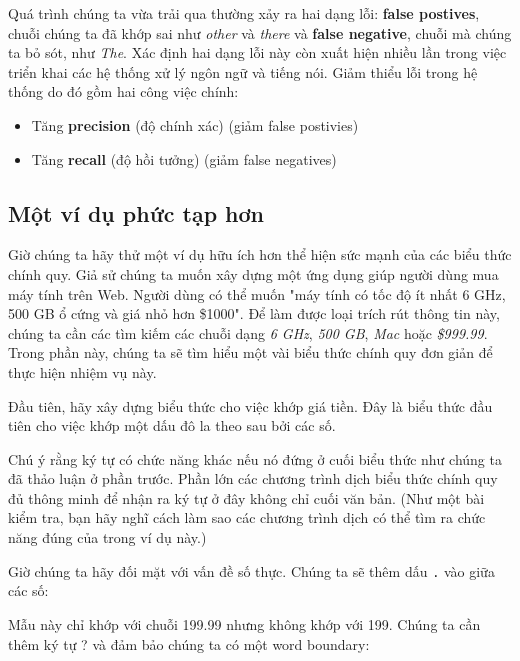
Quá trình chúng ta vừa trải qua thường xảy ra hai dạng lỗi: \textbf{false postives}, chuỗi chúng ta đã khớp sai như \textit{other} và \textit{there} và \textbf{false negative}, chuỗi mà chúng ta bỏ sót, như \textit{The}. Xác định hai dạng lỗi này còn xuất hiện nhiều lần trong việc triển khai các hệ thống xử lý ngôn ngữ và tiếng nói. Giảm thiểu lỗi trong hệ thống do đó gồm hai công việc chính:

\begin{itemize}
  \item Tăng \textbf{precision} (độ chính xác) (giảm false postivies)
  \item Tăng \textbf{recall} (độ hồi tưởng) (giảm false negatives)
\end{itemize}

\subsection{Một ví dụ phức tạp hơn}

Giờ chúng ta hãy thử một ví dụ hữu ích hơn thể hiện sức mạnh của các biểu thức chính quy. Giả sử chúng ta muốn xây dựng một ứng dụng giúp người dùng mua máy tính trên Web. Người dùng có thể muốn "máy tính có tốc độ ít nhất 6 GHz, 500 GB ổ cứng và giá nhỏ hơn \$1000". Để làm được loại trích rút thông tin này, chúng ta cần các tìm kiếm các chuỗi dạng \textit{6 GHz}, \textit{500 GB}, \textit{Mac} hoặc \textit{\$999.99}. Trong phần này, chúng ta sẽ tìm hiểu một vài biểu thức chính quy đơn giản để thực hiện nhiệm vụ này.

Đầu tiên, hãy xây dựng biểu thức cho việc khớp giá tiền. Đây là biểu thức đầu tiên cho việc khớp một dấu đô la theo sau bởi các số.

\codeexamples{/$[0-9]+/}

	Chú ý rằng ký tự  có chức năng khác nếu nó đứng ở cuối biểu thức như chúng ta đã thảo luận ở phần trước. Phần lớn các chương trình dịch biểu thức chính quy đủ thông minh để nhận ra ký tự  ở đây không chỉ cuối văn bản. (Như một bài kiểm tra, bạn hãy nghĩ cách làm sao các chương trình dịch có thể tìm ra chức năng đúng của  trong ví dụ này.)

Giờ chúng ta hãy đối mặt với vấn đề số thực. Chúng ta sẽ thêm dấu \verb|.| vào giữa các số:

\codeexamples{/$[0-9]+\.[0-9][0-9]/}

Mẫu này chỉ khớp với chuỗi 199.99 nhưng không khớp với 199. Chúng ta cần thêm ký tự ? và đảm bảo chúng ta có một word boundary:


